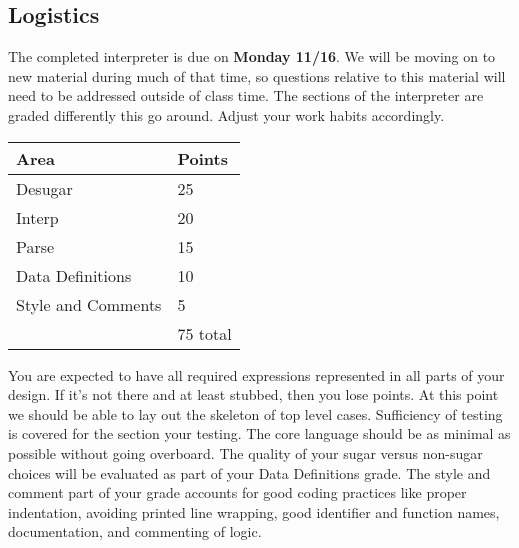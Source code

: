 \documentclass[10pt]{article}
\begin{document}
\subsection*{Logistics}

The completed interpreter is due on \textbf{Monday 11/16}. We will be moving on to new material during much of that time, so questions relative to this material will need to be addressed outside of class time. The sections of the interpreter are graded differently this go around. Adjust your work habits accordingly.

\begin{center}
\begin{tabular}{ll}
Area & Points \\ \hline
Desugar & 25 \\
Interp & 20 \\
Parse & 15 \\
Data Definitions & 10 \\
Style and Comments & 5 \\ \hline
 & 75 total
\end{tabular}
\end{center}

You are expected to have all required expressions represented in all parts of your design. If it's not there and at least stubbed, then you lose points. At this point we should be able to lay out the skeleton of top level cases. Sufficiency of testing is covered for the section your testing. The core language should be as minimal as possible without going overboard. The quality of your sugar versus non-sugar choices will be evaluated as part of your Data Definitions grade. The style and comment part of your grade accounts for good coding practices like proper indentation, avoiding printed line wrapping, good identifier and function names, documentation, and commenting of logic. 
\end{document}
